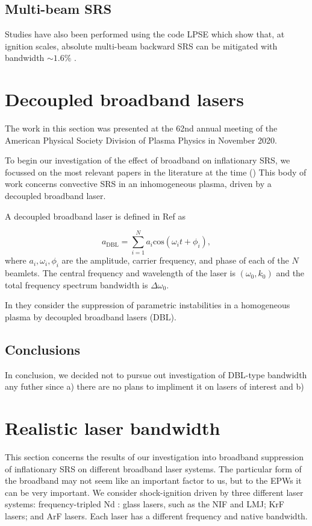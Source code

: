 \subsection{Multi-beam SRS}
Studies have also been performed using the code LPSE which show that, at ignition scales, absolute multi-beam backward SRS can be mitigated with bandwidth $\sim 1.6\%$ \citep{Follett2021}.

\section{Decoupled broadband lasers}

The work in this section was presented at the 62nd annual meeting of the American Physical Society Division of Plasma Physics in November 2020.
 
To begin our investigation of the effect of broadband on inflationary SRS, we focussed on the most relevant papers in the literature at the time (\citep{Zhao_2019}) This body of work concerns convective SRS in an inhomogeneous plasma, driven by a decoupled broadband laser.


A decoupled broadband laser is defined in Ref \cite{Zhao2017July} as

\begin{equation}\label{eqn:DBL}
  a_{\mathrm{DBL}} = \sum_{i=1}^{N} a_i \mathrm{cos}(\omega_it + \phi_i),
\end{equation}
where $a_i,\omega_i,\phi_i$ are the amplitude, carrier frequency, and phase of
each of the $N$ beamlets. The central frequency and wavelength of the laser is
$(\omega_0,k_0)$ and the total frequency spectrum bandwidth is
$\Delta\omega_0$.

In \cite{Zhao_2019} they consider the suppression of parametric
instabilities in a homogeneous plasma by decoupled broadband lasers
(\acrshort{DBL}). 

\subsection{Conclusions}
In conclusion, we decided not to pursue out investigation of DBL-type bandwidth any futher since a) there are no plans to impliment it on lasers of interest and b) 


\section{Realistic laser bandwidth}\label{sec:params}

This section concerns the results of our investigation into broadband suppression of inflationary SRS on different broadband laser systems. The particular form of the broadband may not seem like an important factor to us, but to the EPWs it can be very important.
We consider shock-ignition driven by three different laser systems: frequency-tripled Nd : glass lasers, such as the NIF and LMJ; KrF lasers; and ArF lasers. Each laser has a different frequency and native bandwidth. 

